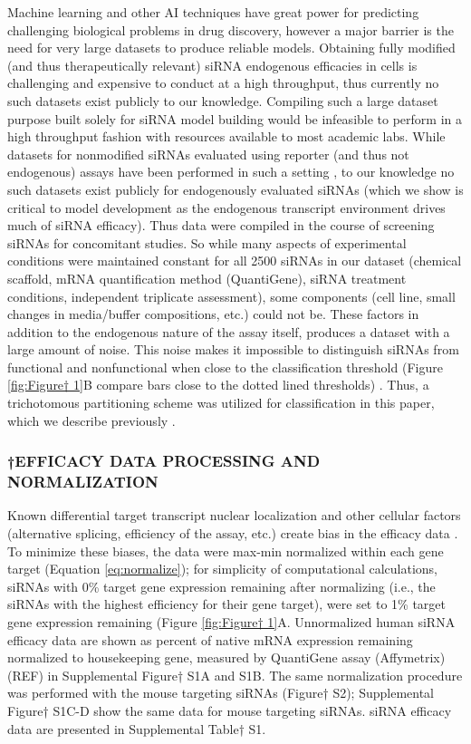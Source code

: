 \documentclass{report}
\begin{document}
Machine learning and other AI techniques have great power for predicting challenging biological problems in drug discovery, however a major barrier is the need for very large datasets to produce reliable models. Obtaining fully modified (and thus therapeutically relevant) siRNA endogenous efficacies in cells is challenging and expensive to conduct at a high throughput, thus currently no such datasets exist publicly to our knowledge. Compiling such a large dataset purpose built solely for siRNA model building would be infeasible to perform in a high throughput fashion with resources available to most academic labs. While datasets for nonmodified siRNAs evaluated using reporter (and thus not endogenous) assays have been performed in such a setting \cite{huesken_design_2005}, to our knowledge no such datasets exist publicly for endogenously evaluated siRNAs (which we show is critical to model development as the endogenous transcript environment drives much of siRNA efficacy). Thus data were compiled in the course of screening siRNAs for concomitant studies. So while many aspects of experimental conditions were maintained constant for all 2500 siRNAs in our dataset (chemical scaffold, mRNA quantification method (QuantiGene), siRNA treatment conditions, independent triplicate assessment), some components (cell line, small changes in media/buffer compositions, etc.) could not be. These factors in addition to the endogenous nature of the assay itself, produces a dataset with a large amount of noise. This noise makes it impossible to distinguish siRNAs from functional and nonfunctional when close to the classification threshold (Figure \ref{fig:Figure† 1}B compare bars close to the dotted lined thresholds) \cite{monopoli_asymmetric_2023}. Thus, a trichotomous partitioning scheme was utilized for classification in this paper, which we describe previously \cite{monopoli_asymmetric_2023}.

\subsubsection{†EFFICACY DATA PROCESSING AND NORMALIZATION}

Known differential target transcript nuclear localization and other cellular factors (alternative splicing, efficiency of the assay, etc.) create bias in the efficacy data \cite{ly_visualization_2017}. To minimize these biases, the data were max-min normalized within each gene target (Equation \ref{eq:normalize}); for simplicity of computational calculations, siRNAs with 0\% target gene expression remaining after normalizing (i.e., the siRNAs with the highest efficiency for their gene target), were set to 1\% target gene expression remaining (Figure \ref{fig:Figure† 1}A. Unnormalized human siRNA efficacy data are shown as percent of native mRNA expression remaining normalized to housekeeping gene, measured by QuantiGene assay (Affymetrix) (REF) in Supplemental Figure† S1A and S1B. The same normalization procedure was performed with the mouse targeting siRNAs (Figure† S2); Supplemental Figure† S1C-D show the same data for mouse targeting siRNAs. siRNA efficacy data are presented in Supplemental Table† S1.
\end{document}
